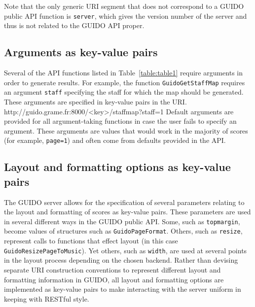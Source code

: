 \documentclass[11pt,a4paper]{article}
\newenvironment{code}		{\vspace{-2mm} \fontsize{8.5pt}{12pt}\selectfont \verbatim}{\endverbatim\vspace{-2mm}}
\begin{document}
Note that the only generic URI segment that does not correspond to a GUIDO public API function is \verb=server=, which gives the version number of the server and thus is not related to the GUIDO API proper.


\subsection{Arguments as key-value pairs}
Several of the API functions listed in Table~\ref{table:table1} require arguments in order to generate results.  For example, the function \verb=GuidoGetStaffMap= requires an argument \verb=staff= specifying the staff for which the map should be generated.  These arguments are specified in key-value pairs in the URI.
\begin{code}
 http://guido.grame.fr:8000/<key>/staffmap?staff=1
\end{code}
Default arguments are provided for all argument-taking functions in case the user fails to specify an argument.  These arguments are values that would work in the majority of scores (for example, \verb&page=1&) and often come from defaults provided in the API.
\subsection{Layout and formatting options as key-value pairs}
The GUIDO server allows for the specification of several parameters relating to the layout and formatting of scores as key-value pairs.  These parameters are used in several different ways in the GUIDO public API.  Some, such as \verb=topmargin=, become values of structures such as \verb=GuidoPageFormat=.  Others, such as \verb=resize=, represent calls to functions that effect layout (in this case \break \verb=GuidoResizePageToMusic=).  Yet others, such as \break \verb=width=, are used at several points in the layout process depending on the chosen backend.  Rather than devising separate URI construction conventions to represent different layout and formatting information in GUIDO, all layout and formatting options are implemented as key-value pairs to make interacting with the server uniform in keeping with RESTful style.\par
\end{document}
